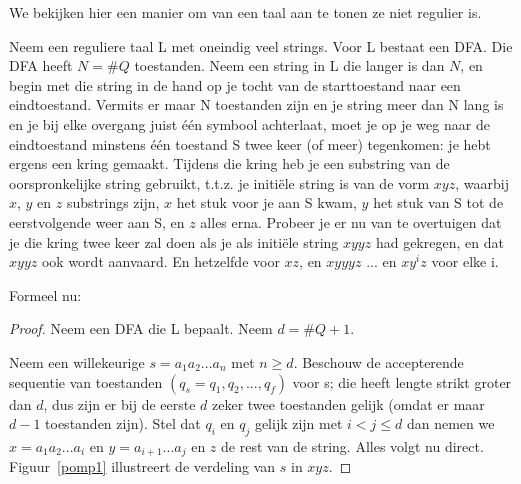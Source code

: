 We bekijken hier een manier om van een taal aan te tonen ze niet
regulier is.

Neem een reguliere taal L met oneindig veel strings. Voor L bestaat
een DFA. Die DFA heeft $N = \#Q$ toestanden. Neem een string in L die
langer is dan $N$, en begin met die string in de hand op je tocht van
de starttoestand naar een eindtoestand. Vermits er maar N toestanden
zijn en je string meer dan N lang is en je bij elke overgang juist
\'{e}\'{e}n symbool achterlaat, moet je op je weg naar de eindtoestand
minstens \'{e}\'{e}n toestand S twee keer (of meer) tegenkomen: je
hebt ergens een kring gemaakt. Tijdens die kring heb je een substring
van de oorspronkelijke string gebruikt, t.t.z. je initi\"ele string is
van de vorm $xyz$, waarbij $x$, $y$ en $z$ substrings zijn, $x$ het
stuk voor je aan S kwam, $y$ het stuk van S tot de eerstvolgende weer
aan S, en $z$ alles erna. Probeer je er nu van te overtuigen dat je
die kring twee keer zal doen als je als initi\"ele string $xyyz$ had
gekregen, en dat $xyyz$ ook wordt aanvaard. En hetzelfde voor $xz$, en
$xyyyz$ ... en $xy^iz$ voor elke i.  

Formeel nu:


\begin{proof}
Neem een DFA die L bepaalt. Neem $d = \#Q + 1$.

Neem een willekeurige $s = a_1a_2...a_n$ met $n \geq d$.
Beschouw de accepterende sequentie van toestanden
$(q_s=q_1,q_2,...,q_f)$ voor s; die heeft lengte strikt groter dan
$d$, dus zijn er bij de eerste $d$ zeker twee toestanden gelijk
(omdat er maar $d-1$ toestanden zijn).  Stel dat $q_i$ en $q_j$ gelijk
zijn met $i < j \leq d$ dan nemen we $x = a_1a_2...a_{i}$ en $y =
a_{i+1}...a_j$ en $z$ de rest van de string. Alles volgt nu
direct.  Figuur~\ref{pomp1} illustreert de verdeling van $s$ in $xyz$.\end{proof}

